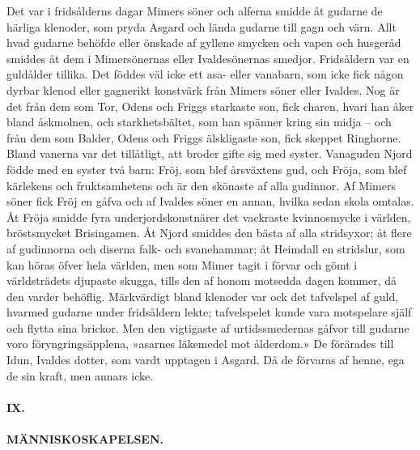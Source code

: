 Det var i fridsålderns dagar Mimers söner och alferna smidde åt gudarne
de härliga klenoder, som pryda Asgard och lända gudarne till gagn och
värn. Allt hvad gudarne behöfde eller önskade af gyllene smycken och
vapen och husgeråd smiddes åt dem i Mimersönernas eller Ivaldesönernas
smedjor. Fridsåldern var en guldålder tillika. Det föddes väl icke ett
asa- eller vanabarn, som icke fick någon dyrbar klenod eller gagnerikt
konstvärk från Mimers söner eller Ivaldes. Nog är det från dem som Tor,
Odens och Friggs starkaste son, fick charen, hvari han åker bland
åskmolnen, och starkhetsbältet, som han spänner kring sin midja -- och
från dem som Balder, Odens och Friggs älskligaste son, fick skeppet
Ringhorne. Bland vanerna var det tillåtligt, att broder gifte sig med
syster. Vanaguden Njord födde med en syster två barn: Fröj, som blef
årsväxtens gud, och Fröja, som blef kärlekens och fruktsamhetens och är
den skönaste af alla gudinnor. Af Mimers söner fick Fröj en
\protect\hypertarget{lb1625905.xhtmlux5cux23start18}{}{}\protect\hypertarget{lb1625905.xhtmlux5cux23start18-a}{}{}\protect\hypertarget{lb1625905.xhtmlux5cux23start18-b}{}{}\protect\hypertarget{lb1625905.xhtmlux5cux23start18-c}{}{}\protect\hypertarget{lb1625905.xhtmlux5cux23start18-d}{}{}
gåfva och af Ivaldes söner en annan, hvilka sedan skola omtalas. Åt
Fröja smidde fyra underjordskonstnärer det vackraste kvinnosmycke i
världen, bröstsmycket Brisingamen. Åt Njord smiddes den bästa af alla
stridsyxor; åt flere af gudinnorna och diserna falk- och svanehammar; åt
Heimdall en stridslur, som kan höras öfver hela världen, men som Mimer
tagit i förvar och gömt i världsträdets djupaste skugga, tills den af
honom motsedda dagen kommer, då den varder behöflig. Märkvärdigt bland
klenoder var ock det tafvelspel af guld, hvarmed gudarne under
fridsåldern lekte; tafvelspelet kunde vara motspelare själf och flytta
sina brickor. Men den vigtigaste af urtidssmedernas gåfvor till gudarne
voro föryngringsäpplena, »asarnes läkemedel mot ålderdom.» De förärades
till Idun, Ivaldes dotter, som vardt upptagen i Asgard. Då de förvaras
af henne, ega de sin kraft, men annars icke.

\paragraph{IX.}

\paragraph{MÄNNISKOSKAPELSEN.}

